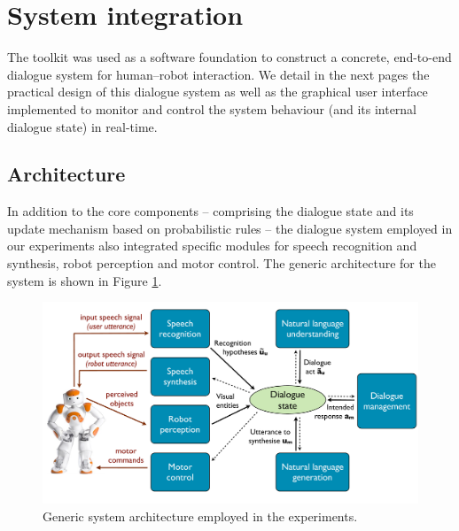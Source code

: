 
\section{System integration}
\label{sec:system-integration}
The \opendial{} toolkit was used as a software foundation to construct a concrete, end-to-end dialogue system for human--robot interaction.  We detail in the next pages the practical design of this dialogue system as well as the graphical user interface implemented to monitor and control the system behaviour (and its internal dialogue state) in real-time. 
\subsection{Architecture}

In addition to the \opendial{} core components -- comprising the dialogue state and its update mechanism based on probabilistic rules -- the dialogue system employed in our experiments also integrated specific modules for speech recognition and synthesis, robot perception and motor control.  The generic architecture for the system is shown in Figure \ref{fig:impl_architecture}. 

\begin{figure}[ht]
\centering
\includegraphics[scale=0.30]{imgs/impl_architecture.pdf}
\caption{Generic system architecture employed in the experiments.}
\label{fig:impl_architecture}
\end{figure}

